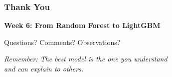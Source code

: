 \documentclass{beamer}
\begin{document}
\begin{frame}[fragile]
\frametitle{Thank You}

\begin{center}
\Large
\textbf{Week 6: From Random Forest to LightGBM}

\vspace{0.5cm}
\normalsize
Questions? Comments? Observations?

\vspace{0.7cm}
\textit{Remember: The best model is the one you understand \\ and can explain to others.}

\end{center}

\end{frame}
\end{document}
